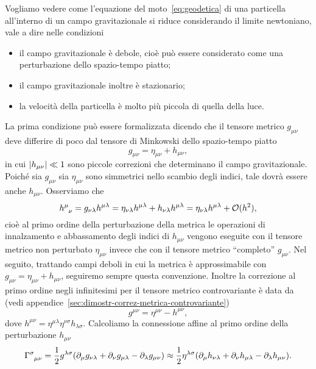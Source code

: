 Vogliamo vedere come l'equazione del moto~\eqref{eq:geodetica} di una particella
all'interno di un campo gravitazionale si riduce considerando il limite
newtoniano, vale a dire nelle condizioni
\begin{itemize}
\item il campo gravitazionale è debole, cioè può essere considerato come una
  perturbazione dello spazio-tempo piatto;
\item il campo gravitazionale inoltre è stazionario;
\item la velocità della particella è molto più piccola di quella della luce.
\end{itemize}
La prima condizione può essere formalizzata dicendo che il
tensore metrico $g_{\mu\nu}$ deve differire di poco dal
tensore di Minkowski dello spazio-tempo piatto
\begin{equation}
  g_{\mu\nu} = \eta_{\mu\nu} + h_{\mu\nu},
\end{equation}
in cui $\lvert h_{\mu\nu}\rvert \ll 1$ sono piccole correzioni che determinano il campo
gravitazionale.  Poiché sia $g_{\mu\nu}$ sia $\eta_{\mu\nu}$ sono simmetrici
nello scambio degli indici, tale dovrà essere anche $h_{\mu\nu}$.  Osserviamo
che
\begin{equation}
  \tensor{h}{^{\mu}_{\nu}} = g_{\nu\lambda}h^{\mu\lambda} =
  \eta_{\nu\lambda}h^{\mu\lambda} + h_{\nu\lambda}h^{\mu\lambda} =
  \eta_{\nu\lambda}h^{\mu\lambda} + \mathcal{O}(h^{2}),
\end{equation}
cioè al primo ordine della perturbazione della metrica le operazioni di
innalzamento e abbassamento degli indici di $h_{\mu\nu}$ vengono eseguite con il
tensore metrico non perturbato $\eta_{\mu\nu}$ invece che con il tensore metrico
``completo'' $g_{\mu\nu}$.  Nel seguito, trattando campi deboli in cui la
metrica è approssimabile con $g_{\mu\nu} = \eta_{\mu\nu} + h_{\mu\nu}$,
seguiremo sempre questa convenzione.  Inoltre la correzione al primo ordine
negli infinitesimi per il tensore metrico controvariante è data da (vedi
appendice~\ref{sec:dimostr-correz-metrica-controvariante})
\begin{equation}
  \label{eq:correzione-metrica-controvariante}
  g^{\mu\nu} = \eta^{\mu\nu} - h^{\mu\nu},
\end{equation}
dove $h^{\mu\nu} = \eta^{\mu\lambda}\eta^{\nu\sigma} h_{\lambda\sigma}$.
Calcoliamo la connessione affine al primo ordine della perturbazione
$h_{\mu\nu}$
\begin{equation}
  \label{eq:christoffel-approx}
  \tensor{\Gamma}{^{\sigma}_{\mu\nu}} = \frac{1}{2}g^{\lambda\sigma}
  (\partial_{\mu}g_{\nu\lambda} + \partial_{\nu}g_{\mu\lambda}
  - \partial_{\lambda}g_{\mu\nu}) \approx \frac{1}{2}\eta^{\lambda\sigma}
  (\partial_{\mu}h_{\nu\lambda} + \partial_{\nu}h_{\mu\lambda}
  - \partial_{\lambda}h_{\mu\nu}).
\end{equation}
